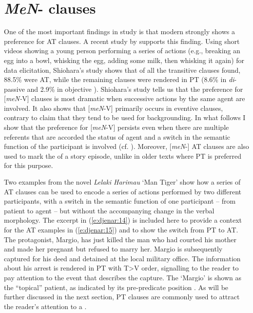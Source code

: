 \documentclass[output=paper
,modfonts
,nonflat]{langsci/langscibook}
\begin{document}
\section{\label{s:djenar:4}\textit{MeN}- clauses}

 One of the most important findings in  study is that modern  strongly shows a preference for AT clauses. A recent study by \citet{Shiohara2015} supports this finding. Using short videos showing a young person performing a series of actions (e.g., breaking an egg into a bowl, whisking the egg, adding some milk, then whisking it again) for data elicitation, Shiohara’s study shows that of all the transitive clauses found, 88.5\% were AT, while the remaining clauses were rendered in PT (8.6\% in \textit{di}- passive and 2.9\% in objective ). Shiohara’s study tells us that the preference for [\textit{meN-}V] clauses is most dramatic when successive actions by the same agent are involved. It also shows that [\textit{meN}-V] primarily occurs in eventive clauses, contrary to   claim that they tend to be used for backgrounding. In what follows I show that the preference for [\textit{meN}-V] persists even when there are multiple referents that are accorded the status of agent and a switch in the semantic function of the participant is involved (cf. \citealt{FoleyEtAL1984}). Moreover, [\textit{meN}-] AT clauses are also used to mark the  of a story episode, unlike in older texts where PT is preferred for this purpose. 
 
 Two examples from the novel \textit{Lelaki Harimau} ‘Man Tiger’ \citep{Kurniawan2004} show how a series of AT clauses can be used to encode a series of actions performed by two different participants, with a switch in the semantic function of one participant – from patient to agent – but without the accompanying change in the verbal morphology. The excerpt in (\ref{e:djenar:14}) is included here to provide a context for the AT examples in (\ref{e:djenar:15}) and to show the switch from PT to AT. The protagonist, Margio, has just killed the man who had courted his mother and made her pregnant but refused to marry her. Margio is subsequently captured for his deed and detained at the local military office. The information about his arrest is rendered in PT with T>V order, signalling to the reader to pay attention to the event that describes the capture. The  ‘Margio’ is shown as the “topical” patient, as indicated by its pre-predicate position \citep[175]{Cumming1991}. As will be further discussed in the next section, PT clauses are commonly used to attract the reader’s attention to a .
\end{document}
